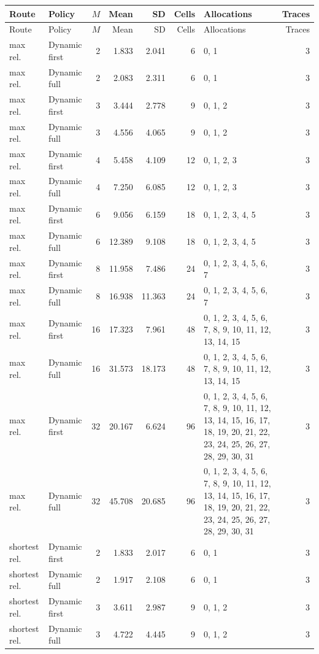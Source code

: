 \documentclass[10pt,a4paper]{article}
\begin{document}
\tiny\setlength{\tabcolsep}{2pt}\begin{longtable}{@{}p{23mm}p{29mm}rrrrp{36mm}r@{}}
\toprule Route & Policy & $M$ & Mean & SD & Cells & Allocations & Traces \\ \midrule\endfirsthead
\toprule Route & Policy & $M$ & Mean & SD & Cells & Allocations & Traces \\ \midrule\endhead
\bottomrule\endfoot
max rel. & Dynamic first & 2 & 1.833 & 2.041 & 6 & 0, 1 & 3 \\
max rel. & Dynamic full & 2 & 2.083 & 2.311 & 6 & 0, 1 & 3 \\
max rel. & Dynamic first & 3 & 3.444 & 2.778 & 9 & 0, 1, 2 & 3 \\
max rel. & Dynamic full & 3 & 4.556 & 4.065 & 9 & 0, 1, 2 & 3 \\
max rel. & Dynamic first & 4 & 5.458 & 4.109 & 12 & 0, 1, 2, 3 & 3 \\
max rel. & Dynamic full & 4 & 7.250 & 6.085 & 12 & 0, 1, 2, 3 & 3 \\
max rel. & Dynamic first & 6 & 9.056 & 6.159 & 18 & 0, 1, 2, 3, 4, 5 & 3 \\
max rel. & Dynamic full & 6 & 12.389 & 9.108 & 18 & 0, 1, 2, 3, 4, 5 & 3 \\
max rel. & Dynamic first & 8 & 11.958 & 7.486 & 24 & 0, 1, 2, 3, 4, 5, 6, 7 & 3 \\
max rel. & Dynamic full & 8 & 16.938 & 11.363 & 24 & 0, 1, 2, 3, 4, 5, 6, 7 & 3 \\
max rel. & Dynamic first & 16 & 17.323 & 7.961 & 48 & 0, 1, 2, 3, 4, 5, 6, 7, 8, 9, 10, 11, 12, 13, 14, 15 & 3 \\
max rel. & Dynamic full & 16 & 31.573 & 18.173 & 48 & 0, 1, 2, 3, 4, 5, 6, 7, 8, 9, 10, 11, 12, 13, 14, 15 & 3 \\
max rel. & Dynamic first & 32 & 20.167 & 6.624 & 96 & 0, 1, 2, 3, 4, 5, 6, 7, 8, 9, 10, 11, 12, 13, 14, 15, 16, 17, 18, 19, 20, 21, 22, 23, 24, 25, 26, 27, 28, 29, 30, 31 & 3 \\
max rel. & Dynamic full & 32 & 45.708 & 20.685 & 96 & 0, 1, 2, 3, 4, 5, 6, 7, 8, 9, 10, 11, 12, 13, 14, 15, 16, 17, 18, 19, 20, 21, 22, 23, 24, 25, 26, 27, 28, 29, 30, 31 & 3 \\
shortest rel. & Dynamic first & 2 & 1.833 & 2.017 & 6 & 0, 1 & 3 \\
shortest rel. & Dynamic full & 2 & 1.917 & 2.108 & 6 & 0, 1 & 3 \\
shortest rel. & Dynamic first & 3 & 3.611 & 2.987 & 9 & 0, 1, 2 & 3 \\
shortest rel. & Dynamic full & 3 & 4.722 & 4.445 & 9 & 0, 1, 2 & 3 \\

\end{longtable}
\end{document}
